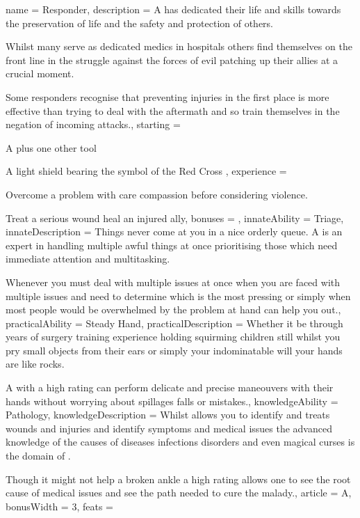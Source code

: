 \archetype
{
	name = Responder,
	description = A \bname{} has dedicated their life and skills towards the preservation of life\comma{} and the safety and protection of others. 

Whilst many serve as dedicated medics in hospitals\comma{} others find themselves on the front line in the struggle against the forces of evil\comma{} patching up their allies at a crucial moment.

Some responders recognise that preventing injuries in the first place is more effective than trying to deal with the aftermath\comma{} and so train themselves in the negation of incoming attacks.,
	starting = 
\item A \comma{} plus one other tool
\item A light shield\comma{} bearing the symbol of the Red Cross
,
	experience = \item Overcome a problem with care\comma{} compassion\comma{} before considering violence. 
\item Treat a serious wound\comma{} heal an injured ally,
	bonuses = 
,
	innateAbility = Triage,
	innateDescription = Things never come at you in a nice orderly queue. A \bname{} is an expert in handling multiple awful things at once\comma{} prioritising those which need immediate attention\comma{} and multitasking. 

Whenever you must deal with multiple issues at once\comma{} when you are faced with multiple issues and need to determine which is the most pressing\comma{} or simply when most people would be overwhelmed by the problem at hand\comma{}  can help you out.,
	practicalAbility = Steady Hand,
	practicalDescription = Whether it be through years of surgery training\comma{} experience holding squirming children still whilst you pry small objects from their ears\comma{} or simply your indominatable will\comma{} your hands are like rocks. 

A \bname{} with a high  rating can perform delicate and precise maneouvers with their hands\comma{} without worrying about spillages\comma{} falls or mistakes.,
	knowledgeAbility = Pathology,
	knowledgeDescription = Whilst  allows you to identify and treats wounds and injuries\comma{} and identify symptoms and medical issues\comma{} the advanced knowledge of the causes of diseases\comma{} infections\comma{} disorders and even magical curses is the domain of . 

Though it might not help a broken ankle\comma{} a high  rating allows one to see the root cause of medical issues\comma{} and see the path needed to cure the malady.,
	article = A,
	bonusWidth = 3, feats = \ResponderFeats
}

